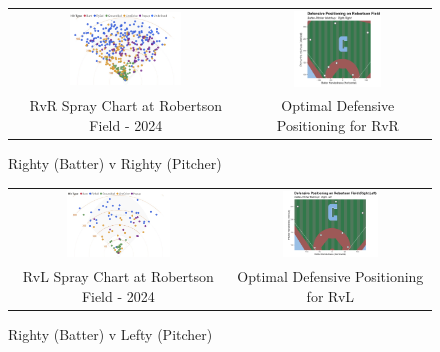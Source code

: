 \documentclass{article}
\begin{document}
\newpage
\begin{figure}[h]
    \centering
    \begin{tabular}{cc}  
        \includegraphics[width=0.5\textwidth]{images/spray24_rvr.png} & 
        \includegraphics[width=0.5\textwidth]{images/optimal_rvr.png} \\
         RvR Spray Chart at Robertson Field - 2024 & Optimal Defensive Positioning for RvR
    \end{tabular}
    \caption{Righty (Batter) v Righty (Pitcher)}
    \label{fig:rightyvrightycomp}
    \cite{trackman2024}
\end{figure}
\vspace{.5cm}
\begin{figure}[h]
    \centering
    \begin{tabular}{cc}  
        \includegraphics[width=0.5\textwidth]{images/spray24_rvl.png} & 
        \includegraphics[width=0.5\textwidth]{images/optimal_rvl.png} \\
         RvL Spray Chart at Robertson Field - 2024 & Optimal Defensive Positioning for RvL
    \end{tabular}
    \caption{Righty (Batter) v Lefty (Pitcher)}
    \label{fig:rightyvleftycomp}
    \cite{trackman2024}
\end{figure}
\vspace{.5cm}
\end{document}
